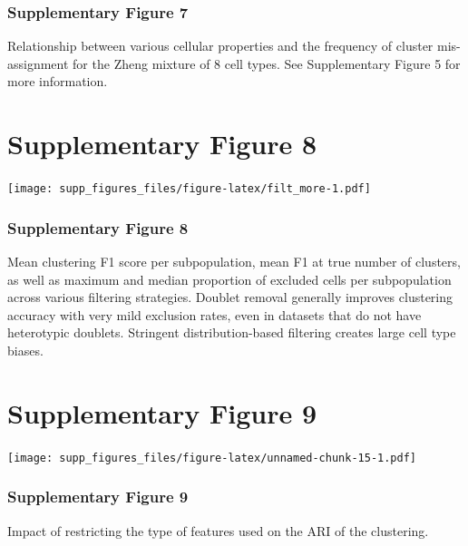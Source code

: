\documentclass[]{article}
\begin{document}
\hypertarget{supplementary-figure-7-1}{%
\subsubsection{Supplementary Figure 7}\label{supplementary-figure-7-1}}

Relationship between various cellular properties and the frequency of
cluster mis-assignment for the Zheng mixture of 8 cell types. See
Supplementary Figure 5 for more information.

\newpage

\hypertarget{supplementary-figure-8}{%
\section{Supplementary Figure 8}\label{supplementary-figure-8}}

\texttt{[image: supp\_figures\_files/figure-latex/filt\_more-1.pdf]}

\hypertarget{supplementary-figure-8-1}{%
\subsubsection{Supplementary Figure 8}\label{supplementary-figure-8-1}}

Mean clustering F1 score per subpopulation, mean F1 at true number of
clusters, as well as maximum and median proportion of excluded cells per
subpopulation across various filtering strategies. Doublet removal
generally improves clustering accuracy with very mild exclusion rates,
even in datasets that do not have heterotypic doublets. Stringent
distribution-based filtering creates large cell type biases.

\newpage

\hypertarget{supplementary-figure-9}{%
\section{Supplementary Figure 9}\label{supplementary-figure-9}}

\texttt{[image: supp\_figures\_files/figure-latex/unnamed-chunk-15-1.pdf]}

\hypertarget{supplementary-figure-9-1}{%
\subsubsection{Supplementary Figure 9}\label{supplementary-figure-9-1}}

Impact of restricting the type of features used on the ARI of the
clustering. \newpage
\end{document}

